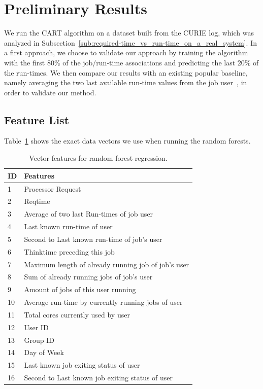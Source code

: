 \documentclass{article}
\begin{document}

  \section{Preliminary Results}
  \label{sec:preliminary_results}
  We run the CART algorithm on a dataset built from the CURIE log, which was analyzed in Subsection~\ref{sub:required-time_vs_run-time_on_a_real_system}. In a first approach, we choose to validate our approach by training the algorithm with the first 80\% of the job/run-time associations and predicting the last 20\% of the run-times. We then compare our results with an existing popular baseline, namely averaging the two last available run-time values from the job user~\cite{tsafir}, in order to validate our method.

  \subsection{Feature List}
  \label{sub:feature_list}
  Table~\ref{tab:features} shows the exact data vectors we use when running the random forests.

  \begin{table}[!ht]
    \centering
    \begin{tabular}{|l|l|}
      \hline
      ID & Features \\
      \hline
      1  &  Processor Request  \\
      2  &  Reqtime  \\
      3  &  Average of two last Run-times of job user \\
      4  &  Last known run-time of user\\
      5  &  Second to Last known run-time of job's user \\
      6  &  Thinktime preceding this job \\
      7  &  Maximum length of already running job of job's user\\
      8  &  Sum of already running jobs of job's user\\
      9  &  Amount of jobs of this user running \\
      10 &  Average run-time by currently running jobs of user\\
      11 &  Total cores currently used by user\\
      12 &  User ID \\
      13 &  Group ID\\
      14 &  Day of Week\\
      15 &  Last known job exiting status of user\\
      16 &  Second to  Last known job exiting status of user\\
      \hline
    \end{tabular}
    \caption{Vector features for random forest regression.}
    \label{tab:features}
  \end{table}
\end{document}
